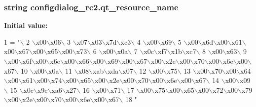 \subsubsection[{qt\+\_\+resource\+\_\+name}]{\setlength{\rightskip}{0pt plus 5cm}string configdialog\+\_\+rc2.\+qt\+\_\+resource\+\_\+name}\label{namespaceconfigdialog__rc2_a5a18ee4bfaabf87bf62bbd1914139145}
{\bfseries Initial value\+:}
\begin{DoxyCode}
1 = \textcolor{stringliteral}{"\(\backslash\)}
2 \textcolor{stringliteral}{\(\backslash\)x00\(\backslash\)x06\(\backslash\)}
3 \textcolor{stringliteral}{\(\backslash\)x07\(\backslash\)x03\(\backslash\)x7d\(\backslash\)xc3\(\backslash\)}
4 \textcolor{stringliteral}{\(\backslash\)x00\(\backslash\)x69\(\backslash\)}
5 \textcolor{stringliteral}{\(\backslash\)x00\(\backslash\)x6d\(\backslash\)x00\(\backslash\)x61\(\backslash\)x00\(\backslash\)x67\(\backslash\)x00\(\backslash\)x65\(\backslash\)x00\(\backslash\)x73\(\backslash\)}
6 \textcolor{stringliteral}{\(\backslash\)x00\(\backslash\)x0a\(\backslash\)}
7 \textcolor{stringliteral}{\(\backslash\)x0c\(\backslash\)xf7\(\backslash\)x1b\(\backslash\)xc7\(\backslash\)}
8 \textcolor{stringliteral}{\(\backslash\)x00\(\backslash\)x63\(\backslash\)}
9 \textcolor{stringliteral}{\(\backslash\)x00\(\backslash\)x6f\(\backslash\)x00\(\backslash\)x6e\(\backslash\)x00\(\backslash\)x66\(\backslash\)x00\(\backslash\)x69\(\backslash\)x00\(\backslash\)x67\(\backslash\)x00\(\backslash\)x2e\(\backslash\)x00\(\backslash\)x70\(\backslash\)x00\(\backslash\)x6e\(\backslash\)x00\(\backslash\)x67\(\backslash\)}
10 \textcolor{stringliteral}{\(\backslash\)x00\(\backslash\)x0a\(\backslash\)}
11 \textcolor{stringliteral}{\(\backslash\)x08\(\backslash\)xab\(\backslash\)xda\(\backslash\)x07\(\backslash\)}
12 \textcolor{stringliteral}{\(\backslash\)x00\(\backslash\)x75\(\backslash\)}
13 \textcolor{stringliteral}{\(\backslash\)x00\(\backslash\)x70\(\backslash\)x00\(\backslash\)x64\(\backslash\)x00\(\backslash\)x61\(\backslash\)x00\(\backslash\)x74\(\backslash\)x00\(\backslash\)x65\(\backslash\)x00\(\backslash\)x2e\(\backslash\)x00\(\backslash\)x70\(\backslash\)x00\(\backslash\)x6e\(\backslash\)x00\(\backslash\)x67\(\backslash\)}
14 \textcolor{stringliteral}{\(\backslash\)x00\(\backslash\)x09\(\backslash\)}
15 \textcolor{stringliteral}{\(\backslash\)x0c\(\backslash\)x9c\(\backslash\)xa6\(\backslash\)x27\(\backslash\)}
16 \textcolor{stringliteral}{\(\backslash\)x00\(\backslash\)x71\(\backslash\)}
17 \textcolor{stringliteral}{\(\backslash\)x00\(\backslash\)x75\(\backslash\)x00\(\backslash\)x65\(\backslash\)x00\(\backslash\)x72\(\backslash\)x00\(\backslash\)x79\(\backslash\)x00\(\backslash\)x2e\(\backslash\)x00\(\backslash\)x70\(\backslash\)x00\(\backslash\)x6e\(\backslash\)x00\(\backslash\)x67\(\backslash\)}
18 \textcolor{stringliteral}{"}
\end{DoxyCode}
\hypertarget{namespaceconfigdialog__rc2_aac6b8df1b9e6e4bb14ed1885360b3449}{}
